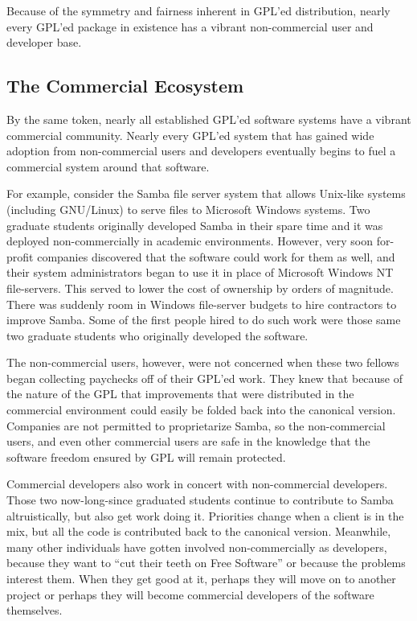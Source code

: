 \documentclass[12pt]{report}
\begin{document}
Because of the symmetry and fairness inherent in GPL'ed distribution,
nearly every GPL'ed package in existence has a vibrant non-commercial user
and developer base.

\subsection{The Commercial Ecosystem}

By the same token, nearly all established GPL'ed software systems have a
vibrant commercial community.  Nearly every GPL'ed system that has gained
wide adoption from non-commercial users and developers eventually begins
to fuel a commercial system around that software.

For example, consider the Samba file server system that allows Unix-like
systems (including GNU/Linux) to serve files to Microsoft Windows systems.
Two graduate students originally developed Samba in their spare time and
it was deployed non-commercially in academic environments.  However, very
soon for-profit companies discovered that the software could work for them
as well, and their system administrators began to use it in place of
Microsoft Windows NT file-servers.  This served to lower the cost of
ownership by orders of magnitude.  There was suddenly room in Windows
file-server budgets to hire contractors to improve Samba.  Some of the first
people hired to do such work were those same two graduate students who
originally developed the software.

The non-commercial users, however, were not concerned when these two
fellows began collecting paychecks off of their GPL'ed work.  They knew
that because of the nature of the GPL that improvements that were
distributed in the commercial environment could easily be folded back into
the canonical version.  Companies are not permitted to proprietarize
Samba, so the non-commercial users, and even other commercial users are
safe in the knowledge that the software freedom ensured by GPL will remain
protected.

Commercial developers also work in concert with non-commercial developers.
Those two now-long-since graduated students continue to contribute to
Samba altruistically, but also get work doing it.  Priorities change when a
client is in the mix, but all the code is contributed back to the
canonical version.  Meanwhile, many other individuals have gotten involved
non-commercially as developers, because they want to ``cut their teeth on
Free Software'' or because the problems interest them.  When they get good
at it, perhaps they will move on to another project or perhaps they will
become commercial developers of the software themselves.
\end{document}
